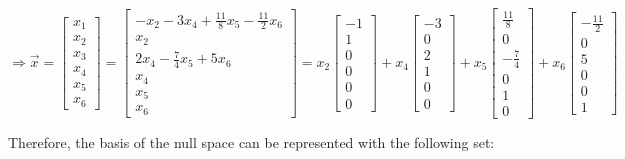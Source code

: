 \documentclass[
  letterpaper,
  DIV=11,
  numbers=noendperiod]{scrartcl}
\begin{document}
\(\Rightarrow \vec{x} = \begin{bmatrix}x_1 \\ x_2 \\ x_3 \\ x_4 \\ x_5 \\ x_6\end{bmatrix}=\begin{bmatrix}-x_2-3x_4+\frac{11}{8}x_5-\frac{11}{2}x_6 \\ x_2 \\ 2x_4-\frac{7}{4}x_5+5x_6 \\ x_4 \\ x_5 \\ x_6\end{bmatrix}=x_2\begin{bmatrix}-1 \\ 1 \\ 0 \\ 0 \\ 0 \\ 0\end{bmatrix}+x_4\begin{bmatrix}-3 \\ 0 \\ 2 \\ 1 \\ 0 \\ 0\end{bmatrix}+x_5\begin{bmatrix}\frac{11}{8}\\ 0 \\ -\frac{7}{4} \\ 0 \\ 1 \\ 0\end{bmatrix}+x_6\begin{bmatrix}-\frac{11}{2} \\ 0 \\ 5 \\ 0 \\ 0 \\ 1\end{bmatrix}\)

\newpage{}

Therefore, the basis of the null space can be represented with the
following set:
\end{document}
